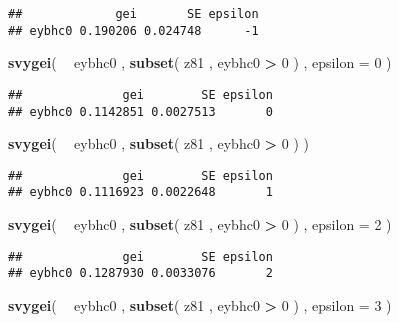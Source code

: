 \documentclass[]{book}
\newenvironment{Shaded}{\begin{snugshade}}{\end{snugshade}}
\newcommand{\DataTypeTok}[1]{\textcolor[rgb]{0.13,0.29,0.53}{#1}}
\newcommand{\DecValTok}[1]{\textcolor[rgb]{0.00,0.00,0.81}{#1}}
\newcommand{\KeywordTok}[1]{\textcolor[rgb]{0.13,0.29,0.53}{\textbf{#1}}}
\newcommand{\NormalTok}[1]{#1}
\newcommand{\OperatorTok}[1]{\textcolor[rgb]{0.81,0.36,0.00}{\textbf{#1}}}
\newcommand{\StringTok}[1]{\textcolor[rgb]{0.31,0.60,0.02}{#1}}
\begin{document}
\begin{verbatim}
##             gei       SE epsilon
## eybhc0 0.190206 0.024748      -1
\end{verbatim}

\begin{Shaded}
\begin{Highlighting}[]
\KeywordTok{svygei}\NormalTok{( }\OperatorTok{~}\StringTok{ }\NormalTok{eybhc0 , }\KeywordTok{subset}\NormalTok{( z81 , eybhc0 }\OperatorTok{>}\StringTok{ }\DecValTok{0}\NormalTok{ ) , }\DataTypeTok{epsilon =} \DecValTok{0}\NormalTok{ )}
\end{Highlighting}
\end{Shaded}

\begin{verbatim}
##              gei        SE epsilon
## eybhc0 0.1142851 0.0027513       0
\end{verbatim}

\begin{Shaded}
\begin{Highlighting}[]
\KeywordTok{svygei}\NormalTok{( }\OperatorTok{~}\StringTok{ }\NormalTok{eybhc0 , }\KeywordTok{subset}\NormalTok{( z81 , eybhc0 }\OperatorTok{>}\StringTok{ }\DecValTok{0}\NormalTok{ ) )}
\end{Highlighting}
\end{Shaded}

\begin{verbatim}
##              gei        SE epsilon
## eybhc0 0.1116923 0.0022648       1
\end{verbatim}

\begin{Shaded}
\begin{Highlighting}[]
\KeywordTok{svygei}\NormalTok{( }\OperatorTok{~}\StringTok{ }\NormalTok{eybhc0 , }\KeywordTok{subset}\NormalTok{( z81 , eybhc0 }\OperatorTok{>}\StringTok{ }\DecValTok{0}\NormalTok{ ) , }\DataTypeTok{epsilon =} \DecValTok{2}\NormalTok{ )}
\end{Highlighting}
\end{Shaded}

\begin{verbatim}
##              gei        SE epsilon
## eybhc0 0.1287930 0.0033076       2
\end{verbatim}

\begin{Shaded}
\begin{Highlighting}[]
\KeywordTok{svygei}\NormalTok{( }\OperatorTok{~}\StringTok{ }\NormalTok{eybhc0 , }\KeywordTok{subset}\NormalTok{( z81 , eybhc0 }\OperatorTok{>}\StringTok{ }\DecValTok{0}\NormalTok{ ) , }\DataTypeTok{epsilon =} \DecValTok{3}\NormalTok{ )}
\end{Highlighting}
\end{Shaded}
\end{document}
